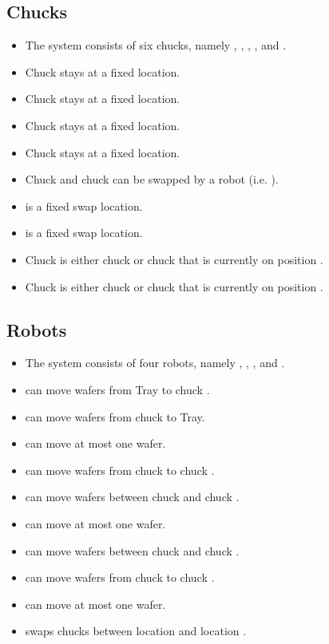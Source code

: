 \subsection{Chucks}
\begin{itemize}
    \item The system consists of six chucks, namely \chuckIn, \chuckOut, \chuckEmptyOne, \chuckEmptyTwo, \chuckA and \chuckB.
    \item Chuck \chuckIn stays at a fixed location.
    \item Chuck \chuckOut stays at a fixed location.
    \item Chuck \chuckEmptyOne stays at a fixed location.
    \item Chuck \chuckEmptyTwo stays at a fixed location.
    \item Chuck \chuckA and chuck \chuckB can be swapped by a robot (i.e. \robotSwap).
    \item \chuckMeas is a fixed swap location.
    \item \chuckProj is a fixed swap location.
    \item Chuck \chuckMeas is either chuck \chuckA or chuck \chuckB that is currently on position \chuckMeas.
    \item Chuck \chuckProj is either chuck \chuckA or chuck \chuckB that is currently on position \chuckProj. 
\end{itemize}

\subsection{Robots}
\begin{itemize}
    \item The system consists of four robots, namely \robotOne, \robotTwo, \robotThree, and \robotSwap.
    \item \robotOne can move wafers from Tray to chuck \chuckIn.
    \item \robotOne can move wafers from chuck \chuckOut to Tray.
    \item \robotOne can move at most one wafer.
    \item \robotTwo can move wafers from chuck \chuckIn to chuck \chuckMeas.
    \item \robotTwo can move wafers between chuck \chuckMeas and chuck \chuckEmptyOne.
    \item \robotOne can move at most one wafer.
    \item \robotThree can move wafers between chuck \chuckMeas and chuck \chuckEmptyTwo.
    \item \robotThree can move wafers from chuck \chuckMeas to chuck \chuckOut.
    \item \robotOne can move at most one wafer.
    \item \robotSwap swaps chucks between location \chuckMeas and location \chuckProj.
\end{itemize}

